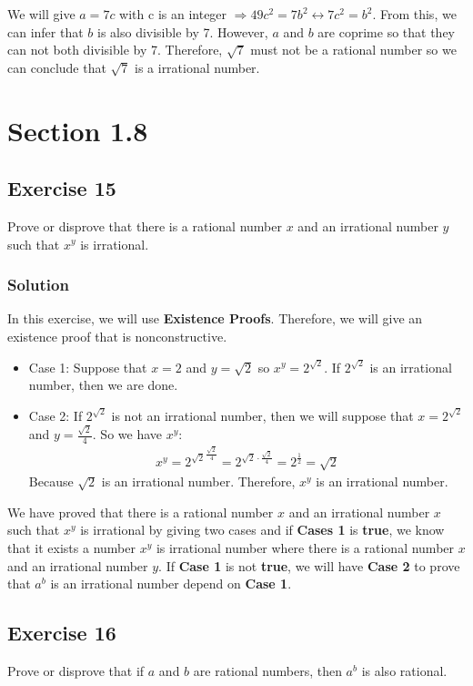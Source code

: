 \documentclass{article}
\begin{document}
We will give $a = 7c$ with c is an integer $\Rightarrow 49c^2 = 7b^2 \leftrightarrow 7c^2 = b^2$. From this, we can infer that $b$ is also divisible by 7. However, $a$ and $b$ are coprime so that they can not both divisible by 7. Therefore, $\sqrt{7}$ must not be a rational number so we can conclude that $\sqrt{7}$ is a irrational number.
\section*{Section 1.8}
\subsection*{Exercise 15}
Prove or disprove that there is a rational number $x$ and an irrational number $y$ such that $x^y$ is irrational.
\subsubsection*{Solution}
In this exercise, we will use \textbf{Existence Proofs}. Therefore, we will give an existence proof that is nonconstructive.
\begin{itemize}
    \item Case 1: Suppose that $x = 2$ and $y = {\sqrt{2}}$ so $x^y = 2^{\sqrt{2}}$. If $2^{\sqrt{2}}$ is an irrational number, then we are done.
    \item Case 2: If $2^{\sqrt{2}}$ is not an irrational number, then we will suppose that $x = 2^{\sqrt{2}}$ and $y = \frac{\sqrt{2}}{4}$. So we have $x^y$:
          \begin{align*}
              x^y = {2^{\sqrt{2}}}^{\frac{\sqrt{2}}{4}} = 2^{\sqrt{2}\cdot\frac{\sqrt{2}}{4}} = 2^{\frac{1}{2}} = \sqrt{2}
          \end{align*}
          Because $\sqrt{2}$ is an irrational number. Therefore, $x^y$ is an irrational number.
\end{itemize}
We have proved that there is a rational number $x$ and an irrational number $x$ such that $x^y$ is irrational by giving two cases and if \textbf{Cases 1} is \textbf{true}, we know that it exists a number $x^y$ is irrational number where there is a rational number $x$ and an irrational number $y$. If \textbf{Case 1} is not \textbf{true}, we will have \textbf{Case 2} to prove that $a^b$ is an irrational number depend on \textbf{Case 1}.
\subsection*{Exercise 16}
Prove or disprove that if $a$ and $b$ are rational numbers, then $a^b$ is also rational.
\end{document}
